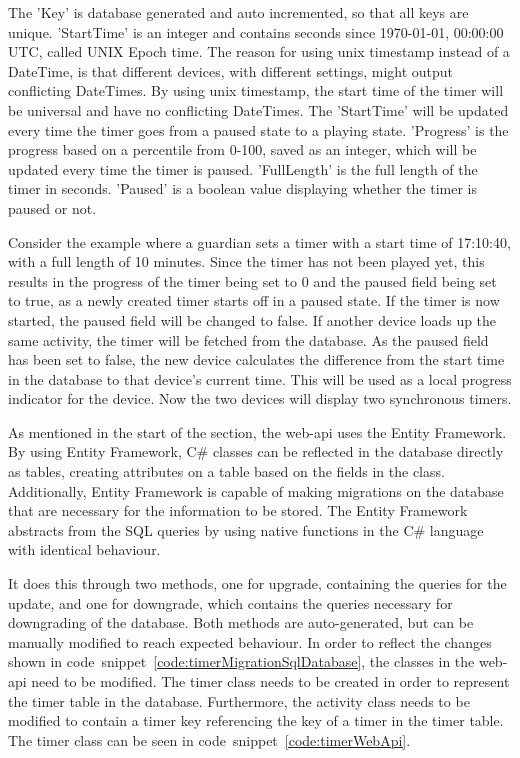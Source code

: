 The 'Key' is database generated and auto incremented, so that all keys are unique.
'StartTime' is an integer and contains seconds since 1970-01-01, 00:00:00 UTC, called UNIX Epoch time. The reason for using unix timestamp instead of a DateTime, is that different devices, with different settings, might output conflicting DateTimes. By using unix timestamp, the start time of the timer will be universal and have no conflicting DateTimes. The 'StartTime' will be updated every time the timer goes from a paused state to a playing state. 
'Progress' is the progress based on a percentile from 0-100, saved as an integer, which will be updated every time the timer is paused.
'FullLength' is the full length of the timer in seconds. 'Paused' is a boolean value displaying whether the timer is paused or not.

Consider the example where a guardian sets a timer with a start time of 17:10:40, with a full length of 10 minutes. Since the timer has not been played yet, this results in the progress of the timer being set to 0 and the paused field being set to true, as a newly created timer starts off in a paused state.
If the timer is now started, the paused field will be changed to false. If another device loads up the same activity, the timer will be fetched from the database. As the paused field has been set to false, the new device calculates the difference from the start time in the database to that device's current time. This will be used as a local progress indicator for the device. Now the two devices will display two synchronous timers.

As mentioned in the start of the section, the web-api uses the Entity Framework. By using Entity Framework, C\# classes can be reflected in the database directly as tables, creating attributes on a table based on the fields in the class. Additionally, Entity Framework is capable of making migrations on the database that are necessary for the information to be stored. The Entity Framework abstracts from the SQL queries by using native functions in the C\# language with identical behaviour.  

It does this through two methods, one for upgrade, containing the queries for the update, and one for downgrade, which contains the queries necessary for downgrading of the database. Both methods are auto-generated, but can be manually modified to reach expected behaviour.
In order to reflect the changes shown in code~snippet~\ref{code:timerMigrationSqlDatabase}, the classes in the web-api need to be modified. The timer class needs to be created in order to represent the timer table in the database. Furthermore, the activity class needs to be modified to contain a timer key referencing the key of a timer in the timer table. The timer class can be seen in code~snippet~\ref{code:timerWebApi}.


